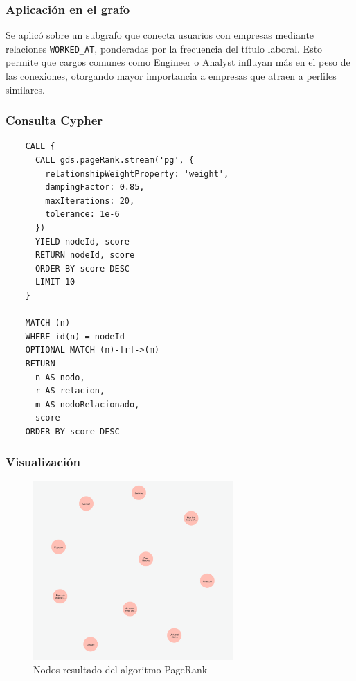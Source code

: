 \documentclass[10pt]{article}
\begin{document}
\subsubsection*{Aplicación en el grafo}
Se aplicó sobre un subgrafo que conecta usuarios con empresas mediante relaciones \texttt{WORKED\_AT}, ponderadas por la frecuencia del título laboral. Esto permite que cargos comunes como Engineer o Analyst influyan más en el peso de las conexiones, otorgando mayor importancia a empresas que atraen a perfiles similares.

\subsubsection*{Consulta Cypher}
\begin{center}
	\begin{lstlisting}
    CALL {
      CALL gds.pageRank.stream('pg', {
        relationshipWeightProperty: 'weight',
        dampingFactor: 0.85,
        maxIterations: 20,
        tolerance: 1e-6
      })
      YIELD nodeId, score
      RETURN nodeId, score
      ORDER BY score DESC
      LIMIT 10
    }
    
    MATCH (n)
    WHERE id(n) = nodeId
    OPTIONAL MATCH (n)-[r]->(m)
    RETURN 
      n AS nodo,
      r AS relacion,
      m AS nodoRelacionado,
      score
    ORDER BY score DESC
    \end{lstlisting}
\end{center}

\subsubsection*{Visualización}
\begin{figure}[H]
	\centering
	\includegraphics[width=0.68\textwidth]{images/pagerank.png}
	\caption{Nodos resultado del algoritmo PageRank}
\end{figure}
\end{document}
